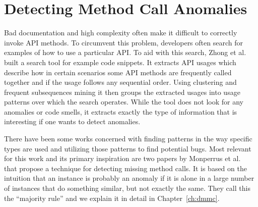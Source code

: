 

\section{Detecting Method Call Anomalies}

Bad documentation and high complexity often make it difficult to correctly invoke API methods.
To circumvent this problem, developers often search for examples of how to use a particular API\@.
To aid with this search, Zhong et al.~\cite{zhong2009mapo} built a search tool for example code snippets.
It extracts API usages which describe how in certain scenarios some API methods are frequently called together and if the usage follows any sequential order.
Using clustering and frequent subsequences mining it then groups the extracted usages into usage patterns over which the search operates.
While the tool does not look for any anomalies or code smells, it extracts exactly the type of information that is interesting if one wants to detect anomalies.

There have been some works concerned with finding patterns in the way specific types are used and utilizing those patterns to find potential bugs.
Most relevant for this work and its primary inspiration are two papers by Monperrus et al.~\cite{monperrus2010detecting}\cite{monperrus2013detecting} that propose a technique for detecting missing method calls.
It is based on the intuition that an instance is probably an anomaly if it is alone in a large number of instances that do something similar, but not exactly the same.
They call this the ``majority rule'' and we explain it in detail in Chapter~\ref{ch:dmmc}.

